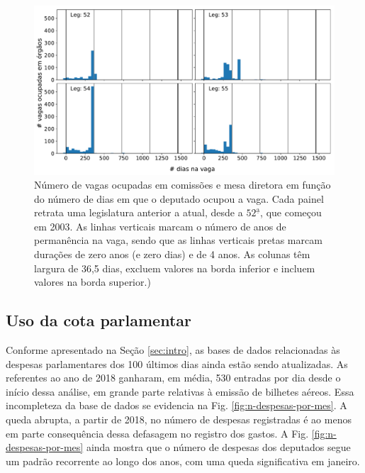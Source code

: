 \documentclass[12pt,a4paper]{article}
\newcommand{\HX}[1]{{\centering\color{red}\large<#1>}}
\begin{document}
\begin{figure}[H]
\centering
\includegraphics[width=1.0\textwidth]{graficos/vagas_ocupadas_por_tempo_na_vaga_2019-05-06.pdf}
\caption{Número de vagas ocupadas em comissões e mesa diretora em função do número de dias em que o deputado
  ocupou a vaga. Cada painel retrata uma legislatura anterior a atual, desde a $52^{\mathrm{\underline{a}}}$,
  que começou em 2003. As linhas verticais marcam o número de anos de permanência na vaga, sendo que as linhas
  verticais pretas marcam durações de zero anos (e zero dias) e de 4 anos. As colunas têm largura de 36,5 dias,
  excluem valores na borda inferior e incluem valores na borda superior.)
}
\label{fig:tempo-na-vaga}
\end{figure} 


\subsection{Uso da cota parlamentar}
\label{sec:cota-parlamentar}

Conforme apresentado na Seção \ref{sec:intro}, as bases de dados relacionadas às despesas parlamentares dos 100 últimos
dias ainda estão sendo atualizadas. As referentes ao ano de 2018 ganharam, em média, 530 entradas por dia desde o início
dessa análise, em grande parte relativas à emissão de bilhetes aéreos. Essa incompleteza da base de dados se evidencia
na Fig. \ref{fig:n-despesas-por-mes}. A queda abrupta, a partir de 2018, no número de despesas registradas é ao menos
em parte consequência dessa defasagem no registro dos gastos. A Fig. \ref{fig:n-despesas-por-mes} ainda mostra que
o número de despesas dos deputados segue um padrão recorrente ao longo dos anos, com uma queda significativa em janeiro.
\end{document}
